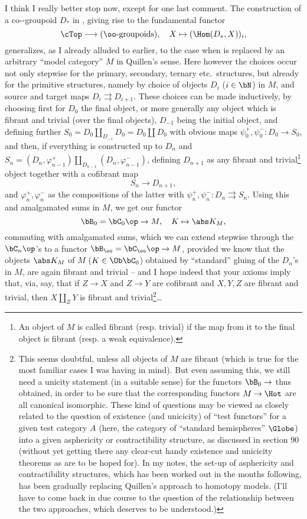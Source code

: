 \label{sec:12}%
I think I really better stop now, except for one last comment. The
construction of a co-\oo-groupoid $D_*$ in \cTop, giving rise to the
fundamental functor
\[ \cTop \longrightarrow (\text{\oo-groupoids}), \quad X \mapsto (\Hom(D_*, X))_i,
\]
generalizes, as I already alluded to earlier, to the case when \cTop{}
is replaced by an arbitrary ``model category'' $M$ in Quillen's sense. Here
however the choices occur not only stepwise for the primary,
secondary, ternary etc.\ structures, but already for the primitive
structures, namely by choice of objects $D_i$ ($i\in\bN$) in $M$, and
source and target maps $D_i \rightrightarrows D_{i+1}$. These choices
can be made inductively, by choosing first for $D_0$ the final object,
or more generally any object which is fibrant and trivial (over the
final objects), $D_{-1}$ being the initial object, and defining
further $S_0 = D_0 \amalg_{D_{-1}} D_0 = D_0 \amalg D_0$ with obvious
maps $\psi_0^+,\psi_0^- : D_0 \to S_0$, and then, if everything is
constructed up to $D_n$ and $S_n = (D_n,\varphi_{n-1}^+)
\amalg_{D_{n-1}} (D_n,\varphi_{n-1}^-)$, defining $D_{n+1}$ as any
fibrant and trivial\footnote{An object of $M$ is called fibrant (resp. trivial) if the map from it to the final object is fibrant (resp. a weak equivalence).} object together with a cofibrant map
\[ S_n \to D_{n+1}, \]
and $\varphi_n^+, \varphi_n^-$ as the compositions of the latter with
$\psi_n^+,\psi_n^-: D_n \rightrightarrows S_n$.
Using this and amalgamated sums in $M$, we get our functor
\[ \bB_0 = \bC_0\op \to M , \quad K\mapsto \abs K_M,\]
commuting with amalgamated sums, which we can extend stepwise through
the $\bC_n\op$'s to a functor $\bB_\oo = \bC_\oo\op \to M$,
provided we know that the objects $\abs K_M$ of $M$ ($K\in\Ob\bC_0$)
obtained by ``standard'' gluing of the $D_n$'s in $M$, are again
fibrant and trivial -- and I hope indeed that your axioms imply that,
via, say, that if $Z \to X$ and $Z\to Y$ are cofibrant and $X,Y,Z$ are
fibrant and trivial, then $X \amalg_Z Y$ is fibrant and trivial\footnote{This seems doubtful, unless all objects of $M$ are fibrant (which is true for the most familiar cases I was having in mind). But even assuming this, we still need a unicity statement (in a suitable sense) for the functors $\bB_0 \to $ thus obtained, in order to be sure that the corresponding functors $M \to \Hot$ are all canonical  isomorphic. These kind of questions may be viewed as closely related to the question of existence (and unicicity) of ``test functors'' for a given test category $A$ (here, the category of ``standard hemispheres'' $\Globe$) into a given asphericity or contractibility structure, as discussed in section 90 (without yet getting there any clear-cut handy existence and unicicity theorems as are to be hoped for). In my notes, the set-up of asphericity and contractibility structures, which has been worked out in the months following, has been gradually replacing Quillen's approach to homotopy models. (I'll have to come back in due course to the question of the relationship between the two approaches, which deserves to be understood.)}\ldots

